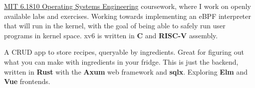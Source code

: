 \documentclass[9pt,letter,normalphoto]{altacv}
\begin{document}
  \divider
  





  \href{https://pdos.csail.mit.edu/6.1810/2023/xv6.html}{MIT 6.1810 Operating Systems Engineering} coursework, where I work on openly available labs and exercises.
  Working towards implementing an eBPF interpreter that will run in the kernel, with the goal of being able to safely run user programs in kernel space. 
  xv6 is written in \textbf{C} and \textbf{RISC-V} assembly.
  
  \divider
  A CRUD app to store recipes, queryable by ingredients. Great for figuring out what you can make with ingredients in your fridge.
  This is just the backend, written in \textbf{Rust} with the \textbf{Axum} web framework and \textbf{sqlx}. Exploring \textbf{Elm} and \textbf{Vue} frontends.
  
\medskip
\end{document}
